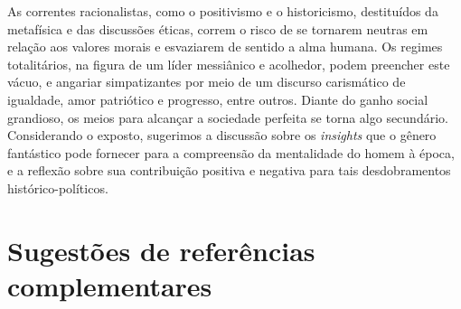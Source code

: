 \documentclass[12pt]{extarticle}
\begin{document}
As correntes racionalistas, como o positivismo e o historicismo,
destituídos da metafísica e das discussões éticas, correm o risco de
se tornarem neutras em relação aos valores morais e esvaziarem de
sentido a alma humana. Os regimes totalitários, na figura de um líder
messiânico e acolhedor, podem preencher este vácuo, e angariar
simpatizantes por meio de um discurso carismático de igualdade, amor
patriótico e progresso, entre outros. Diante do ganho social
grandioso, os meios para alcançar a sociedade perfeita se torna algo
secundário. Considerando o exposto, sugerimos a discussão sobre os
\textit{insights} que o gênero fantástico pode fornecer para a compreensão da
mentalidade do homem à época, e a reflexão sobre sua contribuição
positiva e negativa para tais desdobramentos histórico-políticos.

\section{Sugestões de referências complementares}\label{sugestoes}
\end{document}
